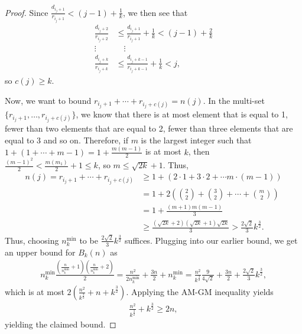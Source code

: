 \documentclass[11pt,reqno]{amsart}
\theoremstyle{plain}
\theoremstyle{definition}
\theoremstyle{remark}
\numberwithin{equation}{section}
\numberwithin{equation}{section}
\begin{document}
\begin{proof}
Since $\frac{d_{i_j+1}}{r_{i_j+1}}< (j-1)+\frac{1}{k}$, we then see that
\begin{align*}
    \frac{d_{i_j+2}}{r_{i_j+2}}&\leq \frac{d_{i_j+1}}{r_{i_j+1}}+\frac{1}{k}< (j-1)+\frac{2}{k}\\
    \vdots\quad &\quad  \vdots\\
    \frac{d_{i_j+k}}{r_{i_j+k}}&\leq  \frac{d_{i_j+k-1}}{r_{i_j+k-1}}+\frac{1}{k}<j,
\end{align*}
so $c(j)\geq k$.

Now, we want to bound $r_{i_j+1}+\cdots+r_{i_j+c(j)}=n(j)$. In the multi-set $\{r_{i_j+1},\ldots,r_{i_j+c(j)}\}$, we know that there is at most element that is equal to 1, fewer than two elements that are equal to 2, fewer than three elements that are equal to 3 and so on. Therefore, if $m$ is the largest integer such that $1+(1+\cdots + m-1) = 1+\frac{m(m-1)}{2}$ is at most $k$, then $\frac{(m-1)^2}{2}<\frac{m(m_1)}{2}+1\leq k$, so $m \leq \sqrt{2k}+1$. Thus,
\begin{align*}
    n(j) = r_{i_j+1}+\cdots+r_{i_j+c(j)}&\geq 1+(2\cdot 1+3\cdot 2+\cdots m\cdot(m-1))\\
    &= 1+2(\binom{2}{2}+\binom{3}{2}+\cdots+\binom{m}{2})\\
    &= 1+ \frac{(m+1)m(m-1)}{3}\\
    &\geq \frac{(\sqrt{2k}+2)(\sqrt{2k}+1)\sqrt{2k}}{3}>\frac{2\sqrt{2}}{3}k^{\frac{3}{2}}.
\end{align*}
Thus, choosing $n_k^{\min}$ to be $\frac{2\sqrt{2}}{3}k^{\frac{3}{2}}$ suffices. Plugging into our earlier bound, we get an upper bound for $B_k(n)$ as
\begin{align*}
    n_k^{\min} \frac{(\frac{n}{n_k^{\min}}+1)(\frac{n}{n_k^{\min}}+2)}{2}=\frac{n^2}{2n_k^{\min}}+ \frac{3n}{2}+n_k^{\min}=\frac{n^2}{k^{\frac{3}{2}}}\frac{9}{4\sqrt{2}}+\frac{3n}{2}+\frac{2\sqrt{2}}{3}k^{\frac{3}{2}},
\end{align*}
which is at most $2(\frac{n^2}{k^{\frac{3}{2}}}+n+k^{\frac{3}{2}})$. Applying the AM-GM inequality yields
\begin{align*}
    \frac{n^2}{k^{\frac{3}{2}}}+k^{\frac{3}{2}}\geq 2n,
\end{align*}
yielding the claimed bound.

\end{proof}
\end{document}
